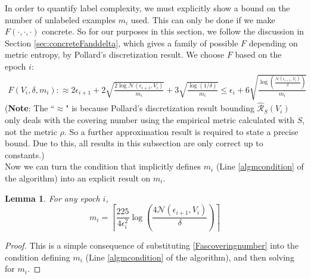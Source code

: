 \documentclass{article}[12pt]
\newtheorem{lem}[thm]{Lemma}
\theoremstyle{named}
\newcommand{\cR}{\mathcal{R}}
\newcommand{\cN}{\mathcal{N}}
\newcommand{\lrp}[1]{\left(#1\right)}
\begin{document}
In order to quantify label complexity, we must explicitly show a bound on the number of unlabeled examples $m_i$ used. 
This can only be done if we make $F(\cdot, \cdot, \cdot)$ concrete. 
So for our purposes in this section, we follow the discussion in Section \ref{sec:concreteFanddelta}, 
which gives a family of possible $F$ depending on metric entropy, by Pollard's discretization result.
We choose $F$ based on the epoch $i$:
\begin{align}
\label{Fascoveringnumber}
F \lrp{ V_i, \delta, m_i } :\approx 
2 \epsilon_{i+1} + 2 \sqrt{\frac{2 \log \cN(\epsilon_{i+1}, V_i) }{m_i}} + 3 \sqrt{\frac{\log (1/\delta)}{m_i}} 
\leq \epsilon_i + 6 \sqrt{\frac{ \log \lrp{\frac{\cN(\epsilon_{i+1}, V_i)}{\delta}}  }{m_i}}
\end{align}
(\textbf{Note}: The ``$\approx$" is because Pollard's discretization result bounding $\hat{\cR}_S (V_i)$ 
only deals with the covering number 
using the empirical metric calculated with $S$, not the metric $\rho$. 
So a further approximation result is required to state a precise bound.
Due to this, all results in this subsection are only correct up to constants.) \\

Now we can turn the condition that implicitly defines $m_i$ 
(Line \ref{algmcondition} of the algorithm) 
into an explicit result on $m_i$.
\begin{lem}
For any epoch $i$,
$$ m_i = \left\lceil \frac{225}{4 \epsilon_i^2} \log \lrp{\frac{4 \cN(\epsilon_{i+1}, V_i)}{\delta}}  \right\rceil $$
\end{lem}
\begin{proof}
This is a simple consequence of substituting \eqref{Fascoveringnumber} 
into the condition defining $m_i$ 
(Line \ref{algmcondition} of the algorithm), 
and then solving for $m_i$.
\end{proof}
\end{document}
